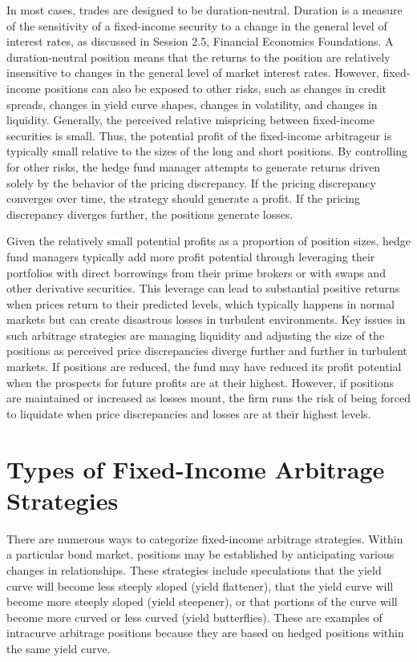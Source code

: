 \documentclass[11pt]{article}
\begin{document}
In most cases, trades are designed to be duration-neutral. Duration is a measure of the sensitivity of a fixed-income security to a change in the general level of interest rates, as discussed in Session 2.5, Financial Economics Foundations. A duration-neutral position means that the returns to the position are relatively insensitive to changes in the general level of market interest rates. However, fixed-income positions can also be exposed to other risks, such as changes in credit spreads, changes in yield curve shapes, changes in volatility, and changes in liquidity. Generally, the perceived relative mispricing between fixed-income securities is small. Thus, the potential profit of the fixed-income arbitrageur is typically small relative to the sizes of the long and short positions. By controlling for other risks, the hedge fund manager attempts to generate returns driven solely by the behavior of the pricing discrepancy. If the pricing discrepancy converges over time, the strategy should generate a profit. If the pricing discrepancy diverges further, the positions generate losses.

Given the relatively small potential profits as a proportion of position sizes, hedge fund managers typically add more profit potential through leveraging their portfolios with direct borrowings from their prime brokers or with swaps and other derivative securities. This leverage can lead to substantial positive returns when prices return to their predicted levels, which typically happens in normal markets but can create disastrous losses in turbulent environments. Key issues in such arbitrage strategies are managing liquidity and adjusting the size of the positions as perceived price discrepancies diverge further and further in turbulent markets. If positions are reduced, the fund may have reduced its profit potential when the prospects for future profits are at their highest. However, if positions are maintained or increased as losses mount, the firm runs the risk of being forced to liquidate when price discrepancies and losses are at their highest levels.

\section*{Types of Fixed-Income Arbitrage Strategies}
There are numerous ways to categorize fixed-income arbitrage strategies. Within a particular bond market, positions may be established by anticipating various changes in relationships. These strategies include speculations that the yield curve will become less steeply sloped (yield flattener), that the yield curve will become more steeply sloped (yield steepener), or that portions of the curve will become more curved or less curved (yield butterflies). These are examples of intracurve arbitrage positions because they are based on hedged positions within the same yield curve.
\end{document}
